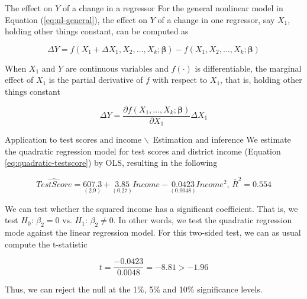 \documentclass[presentation,10pt]{beamer}
\begin{document}
\begin{frame}[label={sec:org7d44912}]{The effect on \(Y\) of a change in a regressor}
For the general nonlinear model in Equation (\ref{eq:nl-general}), the
effect on \(Y\) of a change in one regressor, say \(X_1\), holding other
things constant, can be computed
as

\begin{equation}
\label{eq:nl-gen-effect}
\Delta Y = f(X_1 + \Delta X_1, X_2, \ldots, X_k; \boldsymbol{\beta}) - f(X_1, X_2, \ldots, X_k; \boldsymbol{\beta})
\end{equation}

When \(X_1\) and \(Y\) are continuous variables and \(f(\cdot)\) is
differentiable, the marginal effect of \(X_1\) is the partial derivative
of \(f\) with respect to \(X_1\), that is, holding other things constant

\[ \Delta Y = \frac{\partial f(X_1, \ldots, X_k; \boldsymbol{\beta})}{\partial X_1} \Delta X_1  \]
\end{frame}


\begin{frame}[label={sec:org1f5ddee}]{Application to test scores and income $\backslash$\ \small Estimation and inference}
We estimate the quadratic regression model for test scores and
district income (Equation \ref{eq:quadratic-testscore}) by OLS,
resulting in the following

\begin{equation}
\label{eq:tsr-income2}
\widehat{TestScore} = \underset{\displaystyle (2.9)}{607.3} +
\underset{\displaystyle (0.27)}{3.85}Income - \underset{\displaystyle (0.0048)}{0.0423}Income^2,\, \bar{R}^2 = 0.554
\end{equation}


We can test whether the squared income has a significant
coefficient. That is, we test \(H_0:\, \beta_2 = 0 \text{ vs. } H_1:\,
\beta_2 \neq 0\). In other words, we test the quadratic regression mode
against the linear regression model. For this two-sided test, we can
as usual compute the t-statistic

\[ t = \frac{-0.0423}{0.0048} = -8.81 > -1.96 \]

Thus, we can reject the null at the 1\%, 5\% and 10\% significance levels.
\end{frame}
\end{document}
